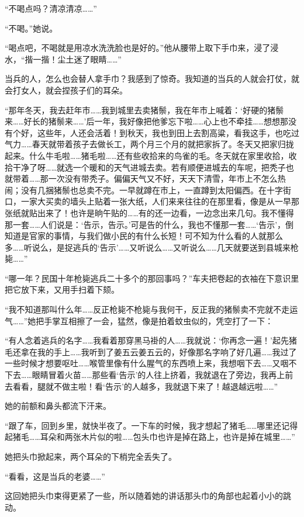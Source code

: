 \par “不喝点吗？清凉清凉……”
\par “不喝。”她说。
\par “喝点吧，不喝就是用凉水洗洗脸也是好的。”他从腰带上取下手巾来，浸了浸水，“揩一揩！尘土迷了眼睛……”
\par 当兵的人，怎么也会替人拿手巾？我感到了惊奇。我知道的当兵的人就会打仗，就会打女人，就会捏孩子们的耳朵。
\par “那年冬天，我去赶年市……我到城里去卖猪鬃，我在年市上喊着：‘好硬的猪鬃来……好长的猪鬃来……’后一年，我好像把他爹忘下啦……心上也不牵挂……想想那没有个好，这些年，人还会活着！到秋天，我也到田上去割高粱，看我这手，也吃过气力……春天就带着孩子去做长工，两个月三个月的就把家拆了。冬天又把家归拢起来。什么牛毛啦……猪毛啦……还有些收拾来的鸟雀的毛。冬天就在家里收拾，收拾干净了呀……就选一个暖和的天气进城去卖。若有顺便进城去的车呢，把秃子也就带着……那一次没有带秃子。偏偏天气又不好，天天下清雪，年市上不怎么热闹；没有几捆猪鬃也总卖不完。一早就蹲在市上，一直蹲到太阳偏西。在十字街口，一家大买卖的墙头上贴着一张大纸，人们来来往往的在那里看，像是从一早那张纸就贴出来了！也许是晌午贴的……有的还一边看，一边念出来几句。我不懂得那一套……人们说是：‘告示，告示。’可是告的什么，我也不懂那一套……‘告示’，倒知道是官家的事情，与我们做小民的有什么长短！可不知为什么看的人就那么多……听说么，是捉逃兵的‘告示’……又听说么……又听说么……几天就要送到县城来枪毙……”
\par “哪一年？民国十年枪毙逃兵二十多个的那回事吗？”车夫把卷起的衣袖在下意识里把它放下来，又用手扫着下颏。
\par “我不知道那叫什么年……反正枪毙不枪毙与我何干，反正我的猪鬃卖不完就不走运气……”她把手掌互相擦了一会，猛然，像是拍着蚊虫似的，凭空打了一下：
\par “有人念着逃兵的名字……我看着那穿黑马褂的人……我就说：‘你再念一遍！’起先猪毛还拿在我的手上……我听到了姜五云姜五云的，好像那名字响了好几遍……我过了一些时候才想要呕吐……喉管里像有什么腥气的东西喷上来，我想咽下去……又咽不下去……眼睛冒着火苗……那些看‘告示’的人往上挤着，我就退在了旁边，我再上前去看看，腿就不做主啦！看‘告示’的人越多，我就退下来了！越退越远啦……”
\par 她的前额和鼻头都流下汗来。
\par “跟了车，回到乡里，就快半夜了。一下车的时候，我才想起了猪毛……哪里还记得起猪毛……耳朵和两张木片似的啦……包头巾也许是掉在路上，也许是掉在城里……”
\par 她把头巾掀起来，两个耳朵的下梢完全丢失了。
\par “看看，这是当兵的老婆……”
\par 这回她把头巾束得更紧了一些，所以随着她的讲话那头巾的角部也起着小小的跳动。
